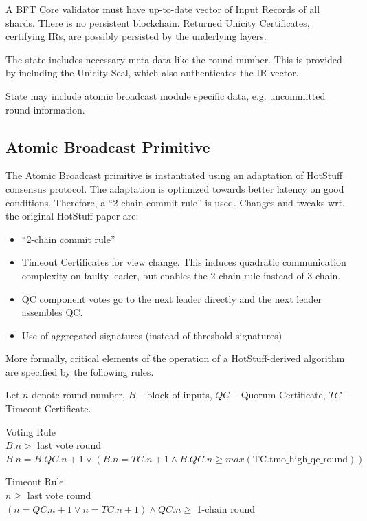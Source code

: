 A BFT Core validator must have up-to-date vector of Input Records of all shards. There is no persistent blockchain. Returned Unicity Certificates, certifying IRs, are possibly persisted by the underlying layers.

The state includes necessary meta-data like the round number. This is provided by including the Unicity Seal, which also authenticates the IR vector.

State may include atomic broadcast module specific data, e.g. uncommitted round information.


\subsection{Atomic Broadcast Primitive}

The Atomic Broadcast primitive is instantiated using an adaptation of HotStuff consensus protocol. The adaptation is optimized towards better latency on good conditions. Therefore, a ``2-chain commit rule'' is used. Changes and tweaks wrt. the original HotStuff paper are:

\begin{itemize}
  \item ``2-chain commit rule''
  \item Timeout Certificates for view change. This induces quadratic communication complexity on faulty leader, but enables the 2-chain rule instead of 3-chain.
  \item QC component votes go to the next leader directly and the next leader assembles QC.
  \item Use of aggregated signatures (instead of threshold signatures)
\end{itemize}

More formally, critical elements of the operation of a HotStuff-derived algorithm are specified by the following rules.

Let $n$ denote round number, $B$ -- block of inputs, $QC$ -- Quorum Certificate, $TC$ -- Timeout Certificate.

\begin{ruledef}{Voting Rule} \\
  $B.n > $ last vote round \\
  $B.n = B.QC.n + 1 \lor (B.n = TC.n + 1 \land B.QC.n \ge max(\text{TC.tmo\_high\_qc\_round}))$
\end{ruledef}

\begin{ruledef}{Timeout Rule} \\
    $n \ge $ last vote round \\
    $(n = QC.n + 1 \lor n = TC.n + 1) \land QC.n \ge $ 1-chain round
\end{ruledef}

